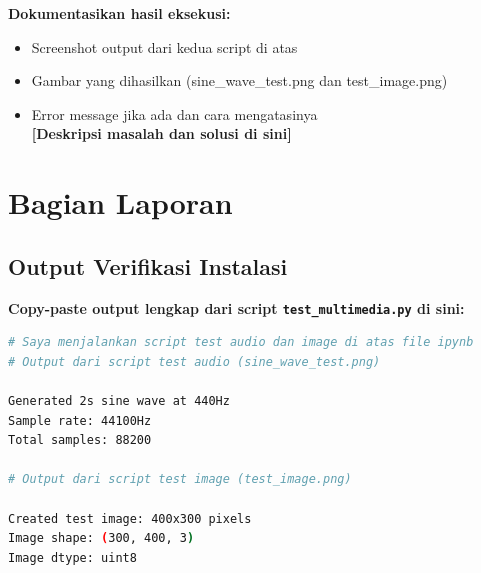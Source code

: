 \documentclass[11pt,a4paper]{article}
\begin{document}
\textbf{Dokumentasikan hasil eksekusi:}
\begin{itemize}
    \item Screenshot output dari kedua script di atas
    \item Gambar yang dihasilkan (sine\_wave\_test.png dan test\_image.png)\\    
    \item Error message jika ada dan cara mengatasinya\\
    \textbf{[Deskripsi masalah dan solusi di sini]}
\end{itemize}

\section{Bagian Laporan}

\subsection{Output Verifikasi Instalasi}
\textbf{Copy-paste output lengkap dari script \texttt{test\_multimedia.py} di sini:}
\begin{lstlisting}[language=bash, caption=Output verifikasi instalasi]
# Saya menjalankan script test audio dan image di atas file ipynb
# Output dari script test audio (sine_wave_test.png)

Generated 2s sine wave at 440Hz
Sample rate: 44100Hz
Total samples: 88200

# Output dari script test image (test_image.png)

Created test image: 400x300 pixels
Image shape: (300, 400, 3)
Image dtype: uint8
\end{lstlisting}
\end{document}
